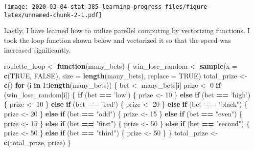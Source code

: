 \documentclass[]{article}
\newenvironment{Shaded}{\begin{snugshade}}{\end{snugshade}}
\newcommand{\ControlFlowTok}[1]{\textcolor[rgb]{0.13,0.29,0.53}{\textbf{#1}}}
\newcommand{\DataTypeTok}[1]{\textcolor[rgb]{0.13,0.29,0.53}{#1}}
\newcommand{\DecValTok}[1]{\textcolor[rgb]{0.00,0.00,0.81}{#1}}
\newcommand{\KeywordTok}[1]{\textcolor[rgb]{0.13,0.29,0.53}{\textbf{#1}}}
\newcommand{\NormalTok}[1]{#1}
\newcommand{\OperatorTok}[1]{\textcolor[rgb]{0.81,0.36,0.00}{\textbf{#1}}}
\newcommand{\OtherTok}[1]{\textcolor[rgb]{0.56,0.35,0.01}{#1}}
\newcommand{\StringTok}[1]{\textcolor[rgb]{0.31,0.60,0.02}{#1}}
\begin{document}
\texttt{[image: 2020-03-04-stat-385-learning-progress\_files/figure-latex/unnamed-chunk-2-1.pdf]}

Lastly, I have learned how to utilize parellel computing by vectorizing
functions. I took the loop function shown below and vectorized it so
that the speed was increased significantly.

\begin{Shaded}
\begin{Highlighting}[]
\NormalTok{roulette_loop <-}\StringTok{ }\ControlFlowTok{function}\NormalTok{(many_bets) \{}
\NormalTok{  win_lose_random <-}\StringTok{ }\KeywordTok{sample}\NormalTok{(}\DataTypeTok{x =} \KeywordTok{c}\NormalTok{(}\OtherTok{TRUE}\NormalTok{, }\OtherTok{FALSE}\NormalTok{), }\DataTypeTok{size =} \KeywordTok{length}\NormalTok{(many_bets),}
                            \DataTypeTok{replace =} \OtherTok{TRUE}\NormalTok{)}
\NormalTok{  total_prize <-}\StringTok{ }\KeywordTok{c}\NormalTok{()}
  \ControlFlowTok{for}\NormalTok{ (i }\ControlFlowTok{in} \DecValTok{1}\OperatorTok{:}\KeywordTok{length}\NormalTok{(many_bets)) \{}
\NormalTok{    bet <-}\StringTok{ }\NormalTok{many_bets[i]}
\NormalTok{    prize <-}\StringTok{ }\DecValTok{0}
    \ControlFlowTok{if}\NormalTok{ (win_lose_random[i]) \{}
      \ControlFlowTok{if}\NormalTok{ (bet }\OperatorTok{==}\StringTok{ 'low'}\NormalTok{) \{}
\NormalTok{        prize <-}\StringTok{ }\DecValTok{10}
\NormalTok{      \} }\ControlFlowTok{else} \ControlFlowTok{if}\NormalTok{ (bet }\OperatorTok{==}\StringTok{ 'high'}\NormalTok{)\{}
\NormalTok{        prize <-}\StringTok{ }\DecValTok{10}
\NormalTok{      \} }\ControlFlowTok{else} \ControlFlowTok{if}\NormalTok{ (bet }\OperatorTok{==}\StringTok{ 'red'}\NormalTok{) \{}
\NormalTok{        prize <-}\StringTok{ }\DecValTok{20}
\NormalTok{      \} }\ControlFlowTok{else} \ControlFlowTok{if}\NormalTok{ (bet }\OperatorTok{==}\StringTok{ "black"}\NormalTok{) \{}
\NormalTok{        prize <-}\StringTok{ }\DecValTok{20}
\NormalTok{      \} }\ControlFlowTok{else} \ControlFlowTok{if}\NormalTok{ (bet }\OperatorTok{==}\StringTok{ "odd"}\NormalTok{) \{}
\NormalTok{        prize <-}\StringTok{ }\DecValTok{15}
\NormalTok{      \} }\ControlFlowTok{else} \ControlFlowTok{if}\NormalTok{ (bet }\OperatorTok{==}\StringTok{ "even"}\NormalTok{) \{}
\NormalTok{        prize <-}\StringTok{ }\DecValTok{15}
\NormalTok{      \} }\ControlFlowTok{else} \ControlFlowTok{if}\NormalTok{ (bet }\OperatorTok{==}\StringTok{ "first"}\NormalTok{) \{}
\NormalTok{        prize <-}\StringTok{ }\DecValTok{50}
\NormalTok{      \} }\ControlFlowTok{else} \ControlFlowTok{if}\NormalTok{ (bet }\OperatorTok{==}\StringTok{ "second"}\NormalTok{) \{}
\NormalTok{        prize <-}\StringTok{ }\DecValTok{50}
\NormalTok{      \} }\ControlFlowTok{else} \ControlFlowTok{if}\NormalTok{ (bet }\OperatorTok{==}\StringTok{ "third"}\NormalTok{) \{}
\NormalTok{        prize <-}\StringTok{ }\DecValTok{50}
\NormalTok{      \}}
\NormalTok{    \}}
\NormalTok{  total_prize <-}\StringTok{ }\KeywordTok{c}\NormalTok{(total_prize, prize)}
\NormalTok{  \}}
  

\end{Highlighting}
\end{Shaded}
\end{document}
